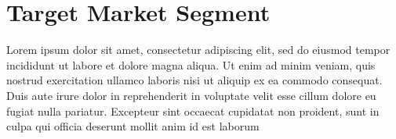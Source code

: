 \section{Target Market Segment}

Lorem ipsum dolor sit amet, consectetur adipiscing elit, sed do eiusmod tempor incididunt ut labore et dolore magna aliqua. Ut enim ad minim veniam, quis nostrud exercitation ullamco laboris nisi ut aliquip ex ea commodo consequat. Duis aute irure dolor in reprehenderit in voluptate velit esse cillum dolore eu fugiat nulla pariatur. Excepteur sint occaecat cupidatat non proident, sunt in culpa qui officia deserunt mollit anim id est laborum


